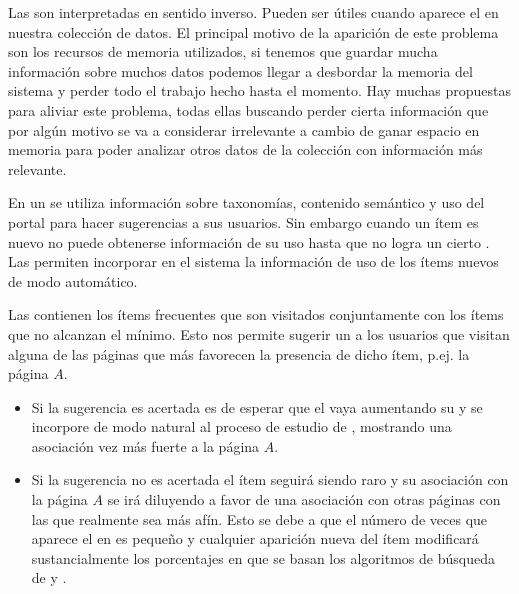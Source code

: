 \ABIERTO

Las \ROPs son \ARs interpretadas en sentido inverso. Pueden ser útiles cuando aparece el \dilemaIR en nuestra colección de datos. El principal motivo de la aparición de este problema son los recursos de memoria utilizados, si tenemos que guardar mucha información sobre muchos datos podemos llegar a desbordar la memoria del sistema y perder todo el trabajo hecho hasta el momento. Hay muchas propuestas para aliviar este problema, todas ellas buscando perder cierta información que por algún motivo se va a considerar irrelevante a cambio de ganar espacio en memoria para poder analizar otros datos de la colección con información más relevante.
























En un \srw se utiliza información sobre taxonomías, contenido semántico y uso del portal para hacer sugerencias a sus usuarios. Sin embargo cuando un ítem es nuevo no puede obtenerse información de su uso hasta que no logra un cierto \soporte. Las \ROPs permiten incorporar en el sistema la información de uso de los ítems nuevos de modo automático.

Las \rops contienen los ítems frecuentes que son visitados conjuntamente con los ítems que no alcanzan el \soporte mínimo. Esto nos permite sugerir un \ir a los usuarios que visitan alguna de las páginas que más favorecen la presencia de dicho ítem, p.ej. la página $A$.

\begin{itemize}
  \item Si la sugerencia es acertada es de esperar que el \ir vaya aumentando su \soporte y se incorpore de modo natural al proceso de estudio de \ars, mostrando una asociación vez más fuerte a la página $A$.
  \item Si la sugerencia no es acertada el ítem seguirá siendo raro y su asociación con la página $A$ se irá diluyendo a favor de una asociación con otras páginas con las que realmente sea más afín. Esto se debe a que el número de veces que aparece el \ir en \D es pequeño y cualquier aparición nueva del ítem modificará sustancialmente los porcentajes en que se basan los algoritmos de búsqueda de \ARs y \ROPs.
\end{itemize}

